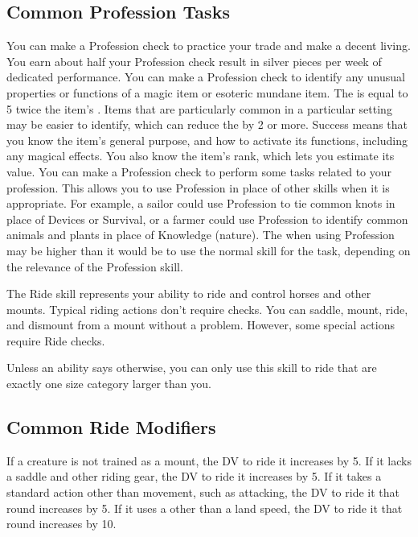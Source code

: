   \subsection{Common Profession Tasks}
     You can make a Profession check to practice your trade and make a decent living.
    You earn about half your Profession check result in silver pieces per week of dedicated performance.
     You can make a Profession check to identify any unusual properties or functions of a magic item or esoteric mundane item.
    The  is equal to 5 \add twice the item's .
    Items that are particularly common in a particular setting may be easier to identify, which can reduce the  by 2 or more.
    Success means that you know the item's general purpose, and how to activate its functions, including any magical effects.
    You also know the item's rank, which lets you estimate its value.
     You can make a Profession check to perform some tasks related to your profession.
    This allows you to use Profession in place of other skills when it is appropriate.
    For example, a sailor could use Profession to tie common knots in place of Devices or Survival, or a farmer could use Profession to identify common animals and plants in place of Knowledge (nature).
    The  when using Profession may be higher than it would be to use the normal skill for the task, depending on the relevance of the Profession skill.

\newpage
{}
  The Ride skill represents your ability to ride and control horses and other mounts.
  Typical riding actions don't require checks. You can saddle, mount, ride, and dismount from a mount without a problem. However, some special actions require Ride checks.

  Unless an ability says otherwise, you can only use this skill to ride  that are exactly one size category larger than you.

  \subsection{Common Ride Modifiers}
    If a creature is not trained as a mount, the DV to ride it increases by 5.
    If it lacks a saddle and other riding gear, the DV to ride it increases by 5.
    If it takes a standard action other than movement, such as attacking, the DV to ride it that round increases by 5.
    If it uses a  other than a land speed, the DV to ride it that round increases by 10.

